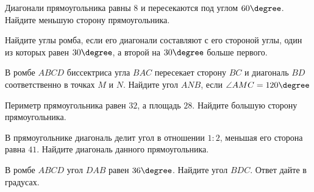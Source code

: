 \begin{class}[number=3]
	\begin{listofex}
		\item Диагонали прямоугольника равны \( 8 \) и пересекаются под углом \( 60\degree \). Найдите меньшую сторону прямоугольника.
		\item Найдите углы ромба, если его диагонали составляют с его стороной углы, один из которых равен \( 30\degree \), а второй на \( 30\degree \) больше первого.
		\item В ромбе \( ABCD \) биссектриса угла \( BAC \) пересекает сторону \( BC \) и диагональ \( BD \) соответственно в точках \( M \) и \( N \). Найдите угол \( ANB \), если \( \angle AMC=120\degree \)
		\item Периметр  прямоугольника равен \( 32 \), а площадь \( 28 \). Найдите большую сторону прямоугольника.
		\item В прямоугольнике диагональ делит угол в отношении \( 1:2 \), меньшая его сторона равна \( 41 \). Найдите диагональ данного прямоугольника.
		\item В ромбе \( ABCD \)  угол \( DAB \)  равен \( 36\degree \). Найдите угол \( BDC \). Ответ дайте в градусах.
	\end{listofex}
\end{class}

